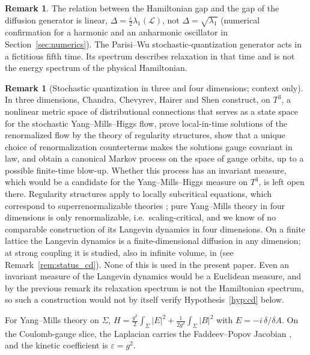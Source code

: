 \documentclass[11pt,a4paper]{amsart}
\theoremstyle{definition}
\newtheorem{remark}[theorem]{Remark}
\newcommand{\cL}{\mathcal{L}}
\begin{document}
\begin{remark}
The relation between the Hamiltonian gap and the gap of the diffusion generator is linear, $\Delta = \frac{\varepsilon}{2}\lambda_1(\cL)$, not $\Delta = \sqrt{\lambda_1}$ (numerical confirmation for a harmonic and an anharmonic oscillator in Section~\ref{sec:numerics}). The Parisi--Wu stochastic-quantization generator acts in a fictitious fifth time. Its spectrum describes relaxation in that time and is not the energy spectrum of the physical Hamiltonian.
\end{remark}

\begin{remark}[Stochastic quantization in three and four dimensions; context only]
\label{rem:stochastic_3d4d}
In three dimensions, Chandra, Chevyrev, Hairer and Shen \cite{chandra2024stochastic} construct, on $T^3$, a nonlinear metric space of distributional connections that serves as a state space for the stochastic Yang--Mills--Higgs flow, prove local-in-time solutions of the renormalized flow by the theory of regularity structures, show that a unique choice of renormalization counterterms makes the solutions gauge covariant in law, and obtain a canonical Markov process on the space of gauge orbits, up to a possible finite-time blow-up. Whether this process has an invariant measure, which would be a candidate for the Yang--Mills--Higgs measure on $T^3$, is left open there. Regularity structures apply to locally subcritical equations, which correspond to superrenormalizable theories \cite{hairer2014theory}; pure Yang--Mills theory in four dimensions is only renormalizable, i.e.\ scaling-critical, and we know of no comparable construction of its Langevin dynamics in four dimensions. On a finite lattice the Langevin dynamics is a finite-dimensional diffusion in any dimension; at strong coupling it is studied, also in infinite volume, in \cite{shen2023stochastic} (see Remark~\ref{rem:status_cd}). None of this is used in the present paper. Even an invariant measure of the Langevin dynamics would be a Euclidean measure, and by the previous remark its relaxation spectrum is not the Hamiltonian spectrum, so such a construction would not by itself verify Hypothesis~\ref{hyp:cd} below.
\end{remark}

For Yang--Mills theory on $\Sigma$, $H = \frac{g^2}{2}\int_\Sigma |E|^2 + \frac{1}{2g^2}\int_\Sigma |B|^2$ with $E = -i\,\delta/\delta A$. On the Coulomb-gauge slice, the Laplacian carries the Faddeev--Popov Jacobian \cite{christ1980operator}, and the kinetic coefficient is $\varepsilon = g^2$.
\end{document}
